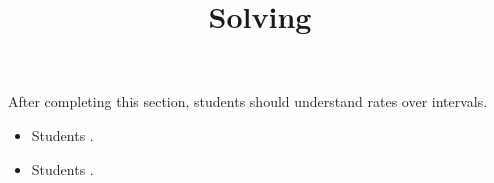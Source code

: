 \documentclass{ximera}
\title{Solving}
\begin{document}
\begin{abstract}
\end{abstract}

\maketitle

\begin{sectionOutcomes}

After completing this section, students should understand rates over intervals. 

\begin{itemize}
\item Students .
\item Students .
\end{itemize}

\end{sectionOutcomes}
\end{document}
